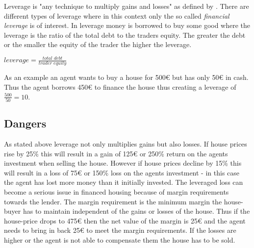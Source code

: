 \documentclass[../Bachelorarbeit.tex]{subfiles}
\begin{document}
Leverage is "any technique to multiply gains and losses" as defined by \cite{Brigham2012}. There are different types of leverage where in this context only the so called \textit{financial leverage} is of interest. In leverage money is borrowed to buy some good where the leverage is the ratio of the total debt to the traders equity. The greater the debt or the smaller the equity of the trader the higher the leverage.

\begin{center}
$leverage = \frac{\textit{total debt}}{\textit{trader equity}}$
\end{center}

\medskip

As an example an agent wants to buy a house for 500\euro{} but has only 50\euro{} in cash. Thus the agent borrows 450\euro{} to finance the house thus creating a leverage of $\frac{500}{50} = 10$.

\subsection{Dangers}
As stated above leverage not only multiplies gains but also losses. If house prices rise by 25\% this will result in a gain of 125\euro{} or 250\% return on the agents investment when selling the house. However if house prices decline by 15\% this will result in a loss of 75\euro{} or 150\% loss on the agents investment - in this case the agent has lost more money than it initially invested. The leveraged loss can become a serious issue in financed housing because of margin requirements towards the lender. The margin requirement is the minimum margin the house-buyer has to maintain independent of the gains or losses of the house. Thus if the house-price drops to 475\euro{} then the net value of the margin is 25\euro{} and the agent needs to bring in back 25\euro{} to meet the margin requirements. If the losses are higher or the agent is not able to compensate them the house has to be sold. 


\end{document}
